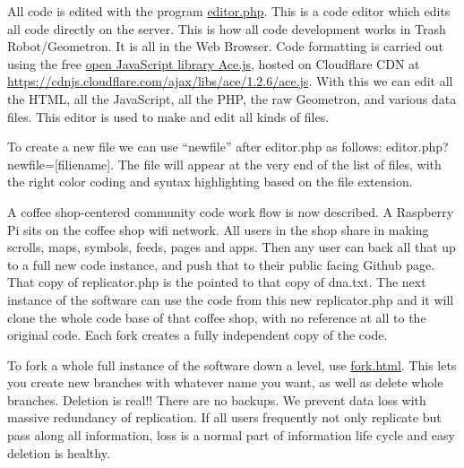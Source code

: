 All code is edited with the program \url{editor.php}. This is a code
editor which edits all code directly on the server. This is how all code
development works in Trash Robot/Geometron. It is all in the Web
Browser. Code formatting is carried out using the free
\href{https://ace.c9.io/}{open JavaScript library Ace.js}, hosted on
Cloudflare CDN at
\url{https://cdnjs.cloudflare.com/ajax/libs/ace/1.2.6/ace.js}. With this
we can edit all the HTML, all the JavaScript, all the PHP, the raw
Geometron, and various data files. This editor is used to make and edit
all kinds of files.

To create a new file we can use ``newfile'' after editor.php as follows:
editor.php?newfile={[}filiename{]}. The file will appear at the very end
of the list of files, with the right color coding and syntax
highlighting based on the file extension.

A coffee shop-centered community code work flow is now described. A
Raspberry Pi sits on the coffee shop wifi network. All users in the shop
share in making scrolls, maps, symbols, feeds, pages and apps. Then any
user can back all that up to a full new code instance, and push that to
their public facing Github page. That copy of replicator.php is the
pointed to that copy of dna.txt. The next instance of the software can
use the code from this new replicator.php and it will clone the whole
code base of that coffee shop, with no reference at all to the original
code. Each fork creates a fully independent copy of the code.

To fork a whole full instance of the software down a level, use
\url{fork.html}. This lets you create new branches with whatever name
you want, as well as delete whole branches. Deletion is real!! There are
no backups. We prevent data loss with massive redundancy of replication.
If all users frequently not only replicate but pass along all
information, loss is a normal part of information life cycle and easy
deletion is healthy.

